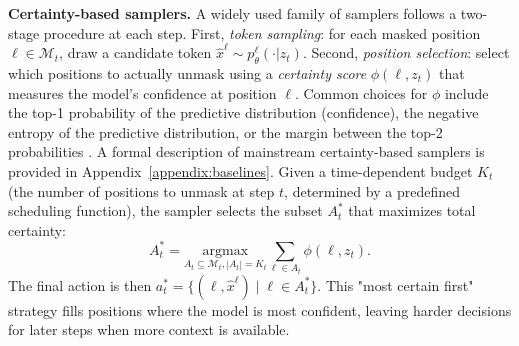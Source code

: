 \noindent\textbf{Certainty-based samplers.}
A widely used family of samplers follows a two-stage procedure at each step. First, \textit{token sampling}: for each masked position $\ell\in\mathcal{M}_t$, draw a candidate token $\hat{x}^\ell\sim p_\theta^\ell(\cdot|z_t)$. Second, \textit{position selection}: select which positions to actually unmask using a \textit{certainty score} $\phi(\ell,z_t)$ that measures the model's confidence at position $\ell$. Common choices for $\phi$ include the top-1 probability of the predictive distribution (confidence), the negative entropy of the predictive distribution, or the margin between the top-2 probabilities \cite{chang2022maskgit, ye2025dream, kim2025train}. A formal description of mainstream certainty-based samplers is provided in Appendix~\ref{appendix:baselines}.
Given a time-dependent budget $K_t$ (the number of positions to unmask at step $t$, determined by a predefined scheduling function), the sampler selects the subset $A_t^*$ that maximizes total certainty:
\begin{equation}
A_t^* = \underset{A_t\subseteq\mathcal{M}_t, |A_t|=K_t}{\mathrm{argmax}} \sum_{\ell\in A_t} \phi(\ell,z_t).
\end{equation}
The final action is then $a_t^* = \{(\ell,\hat{x}^\ell)\mid\ell\in A_t^*\}$. This "most certain first" strategy fills positions where the model is most confident, leaving harder decisions for later steps when more context is available.